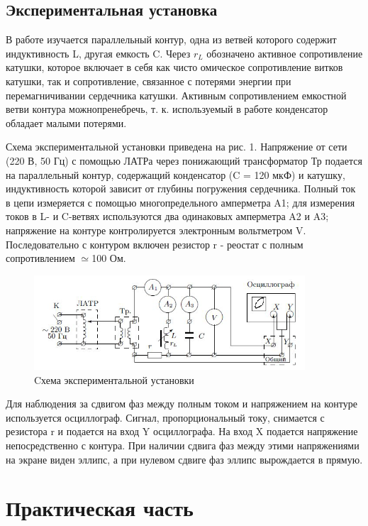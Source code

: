 \documentclass[a4paper, 12pt]{article}
\begin{document}
\newpage
\subsection{Экспериментальная установка}
В работе изучается параллельный контур, одна из ветвей которого содержит индуктивность L, другая емкость C. Через $r_{L}$ обозначено активное сопротивление катушки, которое включает в себя как чисто омическое сопротивление витков катушки, так и сопротивление, связанное с потерями энергии при перемагничивании сердечника катушки. Активным сопротивлением емкостной ветви контура можнопренебречь, т. к. используемый в работе конденсатор обладает малыми потерями. 

Схема экспериментальной установки приведена на рис. 1. Напряжение от сети (220 В, 50 Гц) с помощью ЛАТРа через понижающий трансформатор Тр подается на параллельный контур, содержащий конденсатор (C = 120 мкФ) и катушку, индуктивность которой зависит от глубины погружения сердечника. Полный ток в цепи измеряется с помощью многопредельного амперметра A1; для измерения токов в L- и C-ветвях используются два одинаковых амперметра
A2 и A3; напряжение на контуре контролируется электронным вольтметром V. Последовательно с контуром включен резистор r - реостат с полным сопротивлением $\simeq$100 Ом. 

\begin{figure}[h!]
\begin{center}
\includegraphics[width=0.9\textwidth]{Установка.png}
\end{center}
\caption{Cхема экспериментальной установки}
\end{figure}
Для наблюдения за сдвигом фаз между полным током и напряжением на контуре используется осциллограф. Сигнал, пропорциональный току,
снимается с резистора r и подается на вход Y осциллографа. На вход X
подается напряжение непосредственно с контура. При наличии сдвига
фаз между этими напряжениями на экране виден эллипс, а при нулевом
сдвиге фаз эллипс вырождается в прямую. 


\section{Практическая часть}
\end{document}
